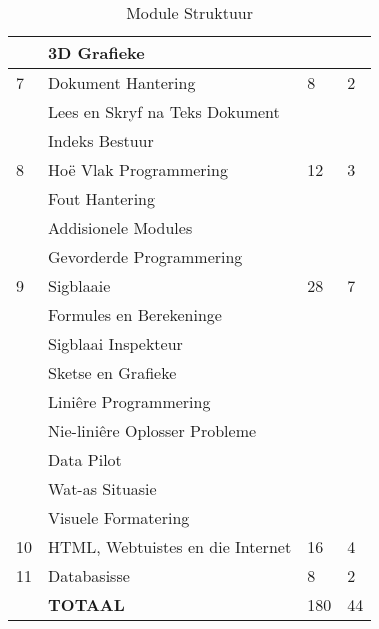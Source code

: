 \begin{table}[!h]
\begin{tabular}{|p{1.4cm}|l|p{2cm}|p{2cm}|}
                    & \qquad 3D Grafieke                        &    &   \\
                 \hline
                 7  & Dokument Hantering                        & 8  & 2 \\
                    & \qquad Lees en Skryf na Teks Dokument     &    &   \\                 
                    & \qquad Indeks Bestuur                        &    &   \\
                 \hline
                 8  & Ho\"{e} Vlak Programmering                & 12 & 3 \\
                    & \qquad Fout Hantering                     &    &   \\
                    & \qquad Addisionele Modules                &    &   \\    
                    & \qquad Gevorderde Programmering           &    &   \\
                 \hline
                 9  & Sigblaaie                                 & 28 & 7 \\
                    & \qquad Formules en Berekeninge            &    &   \\
                    & \qquad Sigblaai Inspekteur                &    &   \\
                    & \qquad Sketse en Grafieke                 &    &   \\
                    & \qquad Lini\^{e}re Programmering          &    &   \\
                    & \qquad Nie-lini\^{e}re Oplosser Probleme  &    &   \\
                    & \qquad Data Pilot                         &    &   \\
                    & \qquad Wat-as Situasie                    &    &   \\
                    & \qquad Visuele Formatering                &    &   \\
                 \hline
                 10 & HTML, Webtuistes  en die Internet         & 16 & 4 \\
                 \hline
                 11 & Databasisse                                & 8  & 2 \\
                 \hline
                    & {\bf TOTAAL}                              &180 &44 \\
                 \hline
             \end{tabular}
             \caption{Module Struktuur}
        \end{table}
        
